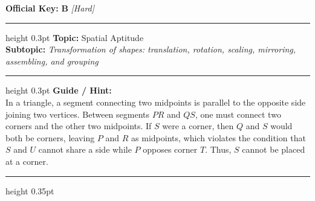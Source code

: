 \documentclass[a4paper,10pt]{article}
\begin{document}
\begin{tcolorbox}
\textbf{Official Key:} \textbf{\large B} \hfill \textit{\small [Hard]}
\vspace{2pt}\hrule height 0.3pt\vspace{3pt}
\textbf{Topic:} Spatial Aptitude \\
\textbf{Subtopic:} \textit{Transformation of shapes: translation, rotation, scaling, mirroring, assembling, and grouping}
\vspace{2pt}\hrule height 0.3pt\vspace{3pt}
\textbf{Guide / Hint:} \\
{\small In a triangle, a segment connecting two midpoints is parallel to the opposite side joining two vertices. Between segments $PR$ and $QS$, one must connect two corners and the other two midpoints. If $S$ were a corner, then $Q$ and $S$ would both be corners, leaving $P$ and $R$ as midpoints, which violates the condition that $S$ and $U$ cannot share a side while $P$ opposes corner $T$. Thus, $S$ cannot be placed at a corner.}

\end{tcolorbox}
\vspace{6pt}\hrule height 0.35pt\vspace{6pt}
\noindent
\end{document}
